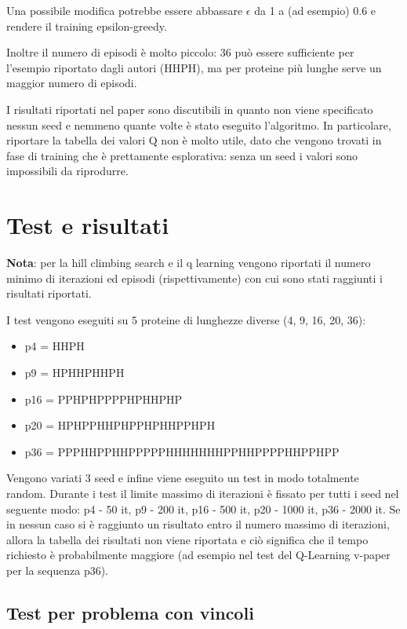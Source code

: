 \documentclass[conference]{IEEEtran}
\begin{document}
Una possibile modifica potrebbe essere abbassare $\epsilon$ da 1 a (ad esempio) 0.6 e rendere il training epsilon-greedy.

Inoltre il numero di episodi è molto piccolo: 36 può essere sufficiente per l'esempio riportato dagli autori (HHPH), ma per proteine più lunghe serve un maggior numero di episodi.

I risultati riportati nel paper sono discutibili in quanto non viene specificato nessun seed e nemmeno quante volte è stato eseguito l'algoritmo. In particolare, riportare la tabella dei valori Q non è molto utile, dato che vengono trovati in fase di training che è prettamente esplorativa: senza un seed i valori sono impossibili da riprodurre.

\section{Test e risultati}

\textbf{Nota}: per la hill climbing search  e il q learning vengono riportati il numero minimo di iterazioni ed episodi (rispettivamente) con cui sono stati raggiunti i risultati riportati.

I test vengono eseguiti su 5 proteine di lunghezze diverse (4, 9, 16, 20, 36):

\begin{itemize}
 \item p4 = HHPH
 \item p9 = HPHHPHHPH
 \item p16 = PPHPHPPPPHPHHPHP
 \item p20 = HPHPPHHPHPPHPHHPPHPH
 \item p36 = PPPHHPPHHPPPPPHHHHHHHPPHHPPPPHHPPHPP
\end{itemize}

Vengono variati 3 seed e infine viene eseguito un test in modo totalmente random. Durante i test il limite massimo di iterazioni è fissato per tutti i seed nel seguente modo: p4 - 50 it, p9 - 200 it, p16 - 500 it, p20 - 1000 it, p36 - 2000 it. Se in nessun caso si è raggiunto un risultato entro il numero massimo di iterazioni, allora la tabella dei risultati non viene riportata e ciò significa che il tempo richiesto è probabilmente maggiore (ad esempio nel test del Q-Learning v-paper per la sequenza p36).

\subsection{Test per problema con vincoli}
\end{document}
